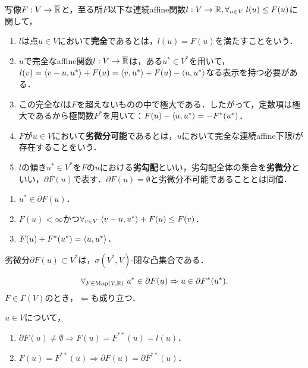 \documentclass[uplatex,dvipdfmx]{jsreport}
\begin{document}
\begin{definition}[exact]
    写像$F:V\to\overline{\mathbb{R}}$と，至る所$F$以下な連続affine関数$l:V\to\mathbb{R},\forall_{u\in V}\;l(u)\le F(u)$に関して，
    \begin{enumerate}
        \item $l$は点$u\in V$において\textbf{完全}であるとは，$l(u)=F(u)$を満たすことをいう．
        \item $u$で完全なaffine関数$l:V\to\overline{\mathbb{R}}$は，ある$u^*\in V^*$を用いて，$l(v)=\langle v-u,u^*\rangle+F(u)=\langle v,u^*\rangle+F(u)-\langle u,u^*\rangle$なる表示を持つ必要がある．
        \item この完全な$l$は$F$を超えないものの中で極大である．したがって，定数項は極大であるから極関数$F^*$を用いて：$F(u)-\langle u,u^*\rangle=-F^*(u^*)$．
        \item $F$が$u\in V$において\textbf{劣微分可能}であるとは，$u$において完全な連続affine下限$l$が存在することをいう．
        \item $l$の傾き$u^*\in V^*$を$F$の$u$における\textbf{劣勾配}といい，劣勾配全体の集合を\textbf{劣微分}といい，$\partial F(u)$で表す．$\partial F(u)=\emptyset$と劣微分不可能であることとは同値．
    \end{enumerate}
\end{definition}

\begin{lemma}[劣勾配の特徴付け]\mbox{}
    \begin{enumerate}
        \item $u^*\in\partial F(u)$．
        \item $F(u)<\infty$かつ$\forall_{v\in V}\;\langle v-u,u^*\rangle+F(u)\le F(v)$．
        \item $F(u)+F^*(u^*)=\langle u,u^*\rangle$．
    \end{enumerate}
\end{lemma}

\begin{corollary}[劣微分は弱閉凸集合]
    劣微分$\partial F(u)\subset V^*$は，$\sigma(V^*,V)$-閉な凸集合である．
\end{corollary}

\begin{corollary}
    \[\forall_{F\in\mathrm{Map}(V,\mathbb{R})}\;u^*\in\partial F(u)\Rightarrow u\in\partial F^*(u^*).\]
    $F\in\Gamma(V)$のとき，$\Leftarrow$も成り立つ．
\end{corollary}

\begin{lemma}[劣微分可能性の必要条件]
    $u\in V$について，
    \begin{enumerate}
        \item $\partial F(u)\ne\emptyset\Rightarrow F(u)=F^{**}(u)=l(u)$．
        \item $F(u)=F^{**}(u)\Rightarrow\partial F(u)=\partial F^{**}(u)$．
    \end{enumerate}
\end{lemma}
\end{document}
